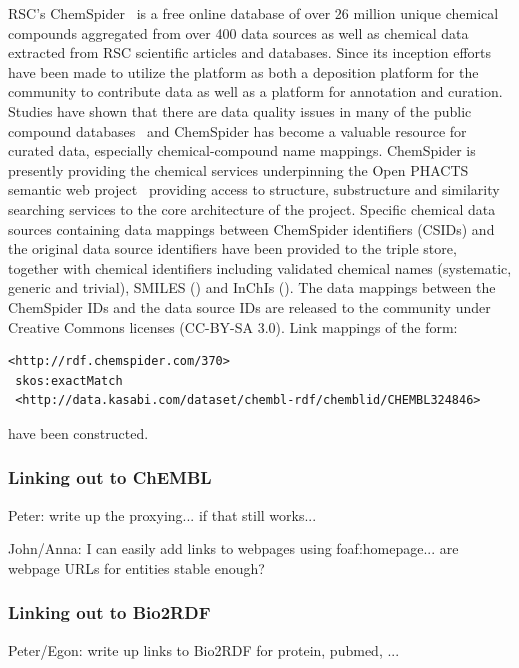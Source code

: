 \documentclass[sw]{iosart2c}
\begin{document}
RSC’s ChemSpider~\cite{Pence2010} is a free online database of over 26 million unique
chemical compounds aggregated from over 400 data sources as well as chemical data extracted
from RSC scientific articles and databases. Since its inception efforts have been made to
utilize the platform as both a deposition platform for the community to contribute data as
well as a platform for annotation and curation. Studies have shown that there are data
quality issues in many of the public compound databases~\cite{Williams2011} and ChemSpider has become a
valuable resource for curated data, especially chemical-compound name mappings. ChemSpider
is presently providing the chemical services underpinning the Open PHACTS semantic web
project~\cite{Williams2012} providing access to structure, substructure and similarity searching services
to the core architecture of the project. Specific chemical data sources containing data
mappings between ChemSpider identifiers (CSIDs) and the original data source identifiers
have been provided to the triple store, together with chemical identifiers including
validated chemical names (systematic, generic and trivial), SMILES () and InChIs (). 
The data mappings between the ChemSpider IDs and the data source IDs are released to
the community under Creative Commons licenses (CC-BY-SA 3.0). Link mappings of the
form:
 
\begin{tiny}
\begin{verbatim}
<http://rdf.chemspider.com/370>
 skos:exactMatch
 <http://data.kasabi.com/dataset/chembl-rdf/chemblid/CHEMBL324846>
\end{verbatim}
\end{tiny}

have been constructed.

\subsubsection{Linking out to ChEMBL}
Peter: write up the proxying... if that still works...


John/Anna: I can easily add links to webpages using foaf:homepage... are webpage URLs for entities stable enough?

\subsubsection{Linking out to Bio2RDF}

Peter/Egon: write up links to Bio2RDF for protein, pubmed, ...
\end{document}
